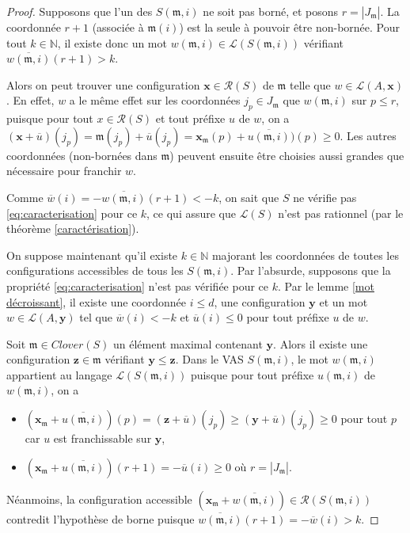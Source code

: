 \documentclass[a4paper,final]{article}
\theoremstyle{definition}
\let\leq\leqslant
\let\geq\geqslant
\newcommand{\N}{\ensuremath{\mathbb{N}}}
\newcommand{\card}[1]{|#1|}
\newcommand{\lang}{\ensuremath{\mathcal{L}}}
\newcommand{\reach}{\ensuremath{\mathcal{R}}}
\newcommand{\clover}{\textit{Clover}}
\newcommand{\vect}[1]{\ensuremath{\mathbf{#1}}}
\newcommand{\valeur}[1]{\ensuremath{\overline{#1}}}
\begin{document}
\begin{proof}
Supposons que l'un des $S(\mathfrak{m},i)$ ne soit pas borné, et posons $r = \card{J_\mathfrak{m}}$.
La coordonnée $r+1$ (associée à $\mathfrak{m}(i)$) est la seule à pouvoir être non-bornée.
Pour tout $k\in\N$, il existe donc un mot $w(\mathfrak{m},i) \in \lang(S(\mathfrak{m},i))$ vérifiant $\valeur{w(\mathfrak{m},i)}(r+1) >k$.

Alors on peut trouver une configuration $\vect{x}\in\reach(S)$ de $\mathfrak{m}$ telle que $w\in\lang(A,\vect{x})$.
En effet, $w$ a le même effet sur les coordonnées $j_p \in J_\mathfrak{m}$ que $w(\mathfrak{m},i)$ sur $p\leq r$,
puisque pour tout $x\in\reach(S)$ et tout préfixe $u$ de $w$, on a
$(\vect{x} +\valeur{u})(j_p) = 
\mathfrak{m}(j_p) +\valeur{u}(j_p) = 
\vect{x}_\mathfrak{m}(p) +\valeur{u(\mathfrak{m},i)})(p) \geq 0$.
Les autres coordonnées (non-bornées dans $\mathfrak{m}$) peuvent ensuite être choisies aussi grandes que nécessaire pour franchir $w$.

Comme $\valeur{w}(i) = -\valeur{w(\mathfrak{m},i)}(r+1) < -k$, on sait que $S$ ne vérifie pas \eqref{eq:caracterisation} pour ce $k$, 
ce qui assure que $\lang(S)$ n'est pas rationnel (par le théorème \ref{caractérisation}).

\vspace{3mm}
On suppose maintenant qu'il existe $k\in\N$ majorant les coordonnées de toutes les configurations accessibles de tous les $S(\mathfrak{m},i)$.
Par l'absurde, supposons que la propriété \eqref{eq:caracterisation} n'est pas vérifiée pour ce $k$.
Par le lemme \ref{mot décroissant}, il existe une coordonnée $i\leq d$, une configuration $\vect{y}$ et un mot $w\in \lang(A,\vect{y})$ tel que  $\valeur{w}(i) < -k$ et $\valeur{u}(i) \leq 0$ pour tout préfixe $u$ de $w$.

Soit $\mathfrak{m} \in\clover(S)$ un élément maximal contenant $\vect{y}$.
Alors il existe une configuration $\vect{z}\in\mathfrak{m}$ vérifiant $\vect{y} \leq \vect{z}$.
Dans le VAS $S(\mathfrak{m},i)$, le mot $w(\mathfrak{m},i)$ appartient au langage $\lang(S(\mathfrak{m},i))$ 
puisque pour tout préfixe $u(\mathfrak{m},i)$ de $w(\mathfrak{m},i)$, on a 
\begin{itemize}
    \item $(\vect{x}_\mathfrak{m} +\valeur{u (\mathfrak{m},i)} )(p) = (\vect{z} +\valeur{u})(j_p) \geq (\vect{y} +\valeur{u})(j_p) \geq 0$ pour tout $p$ car $u$ est franchissable sur $\vect{y}$,
    \item $(\vect{x}_\mathfrak{m} +\valeur{u (\mathfrak{m},i)} )(r+1) = -\valeur{u}(i) \geq 0$ où $r = \card{J_\mathfrak{m}}$.
\end{itemize}
Néanmoins, la configuration accessible $(\vect{x}_\mathfrak{m} + \valeur{w(\mathfrak{m},i)}) \in \reach(S(\mathfrak{m},i))$ contredit l'hypothèse de borne puisque $\valeur{w(\mathfrak{m},i)}(r+1) = -\valeur{w}(i) > k$.

\end{proof}
\end{document}

